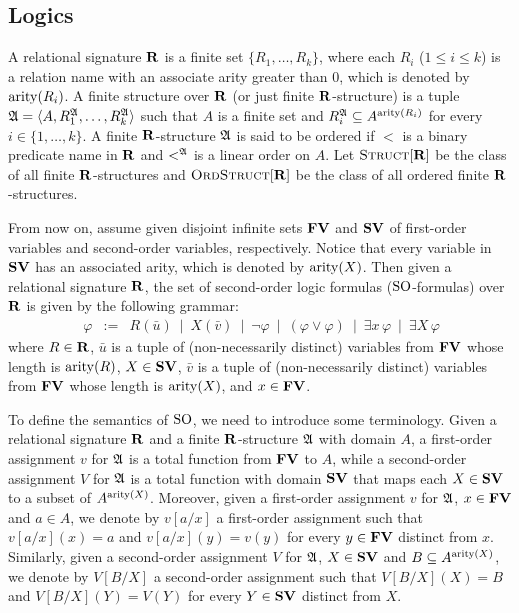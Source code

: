 
\subsection{Logics}

A relational signature $\mathbf{R}$ is a finite set $\{R_1, \ldots, R_k\}$, where each $R_i$ ($1 \leq i \leq k$) is a relation name with an associate arity greater than 0, which is denoted by ${\rm arity}(R_i)$. A finite structure over $\mathbf{R}$ (or just finite $\mathbf{R}$-structure) is a tuple $\mathfrak{A} = \langle A, R_1^{\mathfrak{A}}, \ldots, R_k^{\mathfrak{A}} \rangle$ such that $A$ is a finite set and $R_i^{\mathfrak{A}} \subseteq A^{{\rm arity}(R_i)}$ for every $i \in \{1, \ldots, k\}$. A finite $\mathbf{R}$-structure $\mathfrak{A}$ is said to be ordered if $<$ is a binary predicate name in $\mathbf{R}$ and $<^{\mathfrak{A}}$ is a linear order on $A$. Let $\text{\sc Struct}[\mathbf{R}]$ be the class of all finite $\mathbf{R}$-structures and $\text{\sc OrdStruct}[\mathbf{R}]$ be the class of all ordered finite $\mathbf{R}$-structures. 

From now on, assume given disjoint infinite sets $\mathbf{FV}$ and $\mathbf{SV}$ of first-order variables and second-order variables, respectively. Notice that every variable in $\mathbf{SV}$ has an associated arity, which is denoted by ${\rm arity}(X)$. Then given a relational signature $\mathbf{R}$, the set of second-order logic formulas (${\rm SO}$-formulas) over $\mathbf{R}$ is given by the following grammar:
\begin{eqnarray*}\ 
\varphi &:=& R(\bar u) \ \mid\  
X(\bar v)  \ \mid\ 
\neg \varphi \ \mid\ 
(\varphi \vee \varphi) \ \mid\ 
\exists x \, \varphi \ \mid\ 
\exists X \, \varphi
\end{eqnarray*}
where $R \in \mathbf{R}$, $\bar u$ is a tuple of (non-necessarily distinct) variables from $\mathbf{FV}$ whose length is ${\rm arity}(R)$, $X \in \mathbf{SV}$, $\bar v$ is a tuple of (non-necessarily distinct) variables from $\mathbf{FV}$ whose length is ${\rm arity}(X)$, and $x \in \mathbf{FV}$. 

To define the semantics of ${\rm SO}$, we need to introduce some terminology. Given a relational signature $\mathbf{R}$ and a finite $\mathbf{R}$-structure $\mathfrak{A}$ with domain $A$, a first-order assignment $v$ for $\mathfrak{A}$ is a total function from $\mathbf{FV}$ to $A$, while a second-order assignment $V$ for $\mathfrak{A}$ is a total function with domain $\mathbf{SV}$ that maps each $X \in \mathbf{SV}$ to a subset of $A^{{\rm arity}(X)}$. Moreover, given a first-order assignment $v$ for $\mathfrak{A}$, $x \in \mathbf{FV}$ and $a \in A$, we denote by $v[a/x]$ a first-order assignment such that $v[a/x](x) = a$ and $v[a/x](y) = v(y)$ for every $y \in \mathbf{FV}$ distinct from $x$. Similarly, given a second-order assignment $V$ for $\mathfrak{A}$, $X \in \mathbf{SV}$ and $B  \subseteq A^{{\rm arity}(X)}$, we denote by $V[B/X]$ a second-order assignment such that $V[B/X](X) = B$ and $V[B/X](Y) = V(Y)$ for every $Y \in \mathbf{SV}$ distinct from $X$. 

